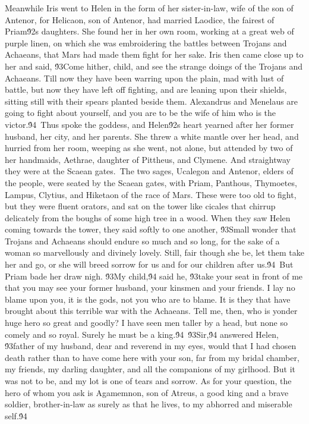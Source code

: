 {Meanwhile Iris went to Helen in the form of her sister-in-law, wife of the son of Antenor, for Helicaon, son of Antenor, had married Laodice, the fairest of Priam\'92s daughters. She found her in her own room, working at a great web of purple linen, on which she was embroidering the battles between Trojans and Achaeans, that Mars had made them fight for her sake. Iris then came close up to her and said, \'93Come hither, child, and see the strange doings of the Trojans and Achaeans. Till now they have been warring upon the plain, mad with lust of battle, but now they have left off fighting, and are leaning upon their shields, sitting still with their spears planted beside them. Alexandrus and Menelaus are going to fight about yourself, and you are to be the wife of him who is the victor.\'94\
Thus spoke the goddess, and Helen\'92s heart yearned after her former husband, her city, and her parents. She threw a white mantle over her head, and hurried from her room, weeping as she went, not alone, but attended by two of her handmaids, Aethrae, daughter of Pittheus, and Clymene. And straightway they were at the Scaean gates.\
The two sages, Ucalegon and Antenor, elders of the people, were seated by the Scaean gates, with Priam, Panthous, Thymoetes, Lampus, Clytius, and Hiketaon of the race of Mars. These were too old to fight, but they were fluent orators, and sat on the tower like cicales that chirrup delicately from the boughs of some high tree in a wood. When they saw Helen coming towards the tower, they said softly to one another, \'93Small wonder that Trojans and Achaeans should endure so much and so long, for the sake of a woman so marvellously and divinely lovely. Still, fair though she be, let them take her and go, or she will breed sorrow for us and for our children after us.\'94\
But Priam bade her draw nigh. \'93My child,\'94 said he, \'93take your seat in front of me that you may see your former husband, your kinsmen and your friends. I lay no blame upon you, it is the gods, not you who are to blame. It is they that have brought about this terrible war with the Achaeans. Tell me, then, who is yonder huge hero so great and goodly? I have seen men taller by a head, but none so comely and so royal. Surely he must be a king.\'94\
\'93Sir,\'94 answered Helen, \'93father of my husband, dear and reverend in my eyes, would that I had chosen death rather than to have come here with your son, far from my bridal chamber, my friends, my darling daughter, and all the companions of my girlhood. But it was not to be, and my lot is one of tears and sorrow. As for your question, the hero of whom you ask is Agamemnon, son of Atreus, a good king and a brave soldier, brother-in-law as surely as that he lives, to my abhorred and miserable self.\'94\
}
